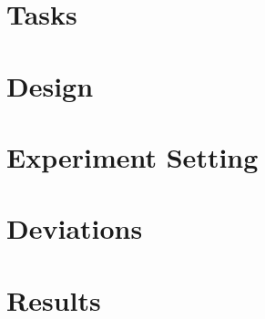 \section{Tasks}

\section{Design}

\section{Experiment Setting}

\section{Deviations}

\section{Results}
